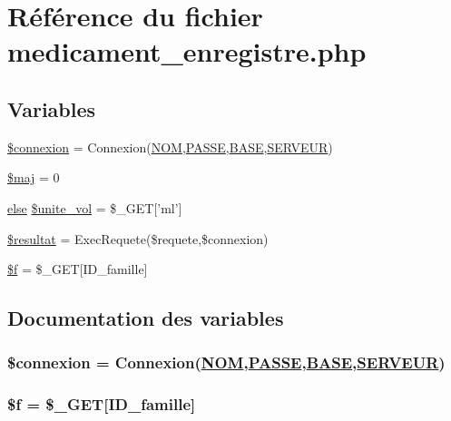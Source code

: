 \hypertarget{medicament__enregistre_8php}{
\section{R\'{e}f\'{e}rence du fichier medicament\_\-enregistre.php}
\label{medicament__enregistre_8php}
}
\subsection*{Variables}
\begin{CompactItemize}
\item 
\hyperlink{medicament__enregistre_8php_a0}{\$connexion} = Connexion(\hyperlink{pma__connect_8php_a0}{NOM},\hyperlink{pma__connect_8php_a1}{PASSE},\hyperlink{pma__connect_8php_a3}{BASE},\hyperlink{pma__connect_8php_a2}{SERVEUR})
\item 
\hyperlink{medicament__enregistre_8php_a1}{\$maj} = 0
\item 
\hyperlink{cron_8php_a9}{else} \hyperlink{medicament__enregistre_8php_a2}{\$unite\_\-vol} = \$\_\-GET\mbox{[}'ml'\mbox{]}
\item 
\hyperlink{medicament__enregistre_8php_a3}{\$resultat} = Exec\-Requete(\$requete,\$connexion)
\item 
\hyperlink{medicament__enregistre_8php_a4}{\$f} = \$\_\-GET\mbox{[}ID\_\-famille\mbox{]}
\end{CompactItemize}


\subsection{Documentation des variables}
\hypertarget{medicament__enregistre_8php_a0}{
\subsubsection[\$connexion]{\setlength{\rightskip}{0pt plus 5cm}\$connexion = Connexion(\hyperlink{pma__connect_8php_a0}{NOM},\hyperlink{pma__connect_8php_a1}{PASSE},\hyperlink{pma__connect_8php_a3}{BASE},\hyperlink{pma__connect_8php_a2}{SERVEUR})}}
\label{medicament__enregistre_8php_a0}


\hypertarget{medicament__enregistre_8php_a4}{
\subsubsection[\$f]{\setlength{\rightskip}{0pt plus 5cm}\$f = \$\_\-GET\mbox{[}ID\_\-famille\mbox{]}}}
\label{medicament__enregistre_8php_a4}


